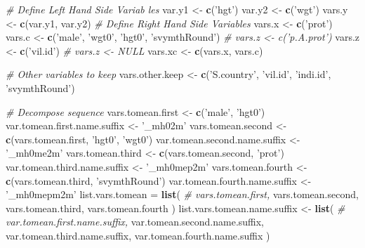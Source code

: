\documentclass[
]{book}
\newenvironment{Shaded}{\begin{snugshade}}{\end{snugshade}}
\newcommand{\CommentTok}[1]{\textcolor[rgb]{0.56,0.35,0.01}{\textit{#1}}}
\newcommand{\KeywordTok}[1]{\textcolor[rgb]{0.13,0.29,0.53}{\textbf{#1}}}
\newcommand{\NormalTok}[1]{#1}
\newcommand{\StringTok}[1]{\textcolor[rgb]{0.31,0.60,0.02}{#1}}
\begin{document}
\begin{Shaded}
\begin{Highlighting}[]
\CommentTok{# Define Left Hand Side Variab les}
\NormalTok{var.y1 <-}\StringTok{ }\KeywordTok{c}\NormalTok{(}\StringTok{'hgt'}\NormalTok{)}
\NormalTok{var.y2 <-}\StringTok{ }\KeywordTok{c}\NormalTok{(}\StringTok{'wgt'}\NormalTok{)}
\NormalTok{vars.y <-}\StringTok{ }\KeywordTok{c}\NormalTok{(var.y1, var.y2)}
\CommentTok{# Define Right Hand Side Variables}
\NormalTok{vars.x <-}\StringTok{ }\KeywordTok{c}\NormalTok{(}\StringTok{'prot'}\NormalTok{)}
\NormalTok{vars.c <-}\StringTok{ }\KeywordTok{c}\NormalTok{(}\StringTok{'male'}\NormalTok{, }\StringTok{'wgt0'}\NormalTok{, }\StringTok{'hgt0'}\NormalTok{, }\StringTok{'svymthRound'}\NormalTok{)}
\CommentTok{# vars.z <- c('p.A.prot')}
\NormalTok{vars.z <-}\StringTok{ }\KeywordTok{c}\NormalTok{(}\StringTok{'vil.id'}\NormalTok{)}
\CommentTok{# vars.z <- NULL}
\NormalTok{vars.xc <-}\StringTok{ }\KeywordTok{c}\NormalTok{(vars.x, vars.c)}

\CommentTok{# Other variables to keep}
\NormalTok{vars.other.keep <-}\StringTok{ }\KeywordTok{c}\NormalTok{(}\StringTok{'S.country'}\NormalTok{, }\StringTok{'vil.id'}\NormalTok{, }\StringTok{'indi.id'}\NormalTok{, }\StringTok{'svymthRound'}\NormalTok{)}

\CommentTok{# Decompose sequence}
\NormalTok{vars.tomean.first <-}\StringTok{ }\KeywordTok{c}\NormalTok{(}\StringTok{'male'}\NormalTok{, }\StringTok{'hgt0'}\NormalTok{)}
\NormalTok{var.tomean.first.name.suffix <-}\StringTok{ '_mh02m'}
\NormalTok{vars.tomean.second <-}\StringTok{ }\KeywordTok{c}\NormalTok{(vars.tomean.first, }\StringTok{'hgt0'}\NormalTok{, }\StringTok{'wgt0'}\NormalTok{)}
\NormalTok{var.tomean.second.name.suffix <-}\StringTok{ '_mh0me2m'}
\NormalTok{vars.tomean.third <-}\StringTok{ }\KeywordTok{c}\NormalTok{(vars.tomean.second, }\StringTok{'prot'}\NormalTok{)}
\NormalTok{var.tomean.third.name.suffix <-}\StringTok{ '_mh0mep2m'}
\NormalTok{vars.tomean.fourth <-}\StringTok{ }\KeywordTok{c}\NormalTok{(vars.tomean.third, }\StringTok{'svymthRound'}\NormalTok{)}
\NormalTok{var.tomean.fourth.name.suffix <-}\StringTok{ '_mh0mepm2m'}
\NormalTok{list.vars.tomean =}\StringTok{ }\KeywordTok{list}\NormalTok{(}
\CommentTok{#                         vars.tomean.first,}
\NormalTok{                        vars.tomean.second,}
\NormalTok{                        vars.tomean.third,}
\NormalTok{                        vars.tomean.fourth}
\NormalTok{                        )}
\NormalTok{list.vars.tomean.name.suffix <-}\StringTok{ }\KeywordTok{list}\NormalTok{(}
\CommentTok{#                                     var.tomean.first.name.suffix,}
\NormalTok{                                     var.tomean.second.name.suffix,}
\NormalTok{                                     var.tomean.third.name.suffix,}
\NormalTok{                                     var.tomean.fourth.name.suffix}
\NormalTok{                                    )}
\end{Highlighting}
\end{Shaded}
\end{document}

